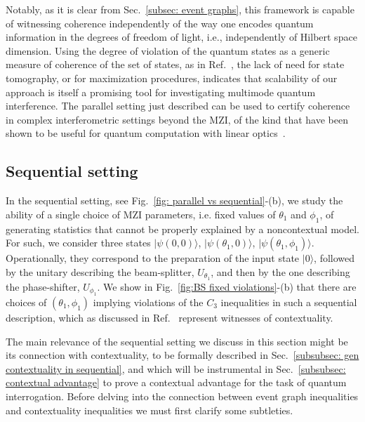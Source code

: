\documentclass[letterpaper,onecolumn,12pt,accepted=2024-01-17]{article}
\begin{document}
Notably, as it is clear from Sec.~\ref{subsec: event graphs}, this framework is capable of witnessing coherence independently of the way one encodes quantum information in the degrees of freedom of light, i.e., independently of Hilbert space dimension. Using the degree of violation of the quantum states as a generic measure of coherence of the set of states, as in Ref.~\cite{giordani2020experimental}, the lack of need for state tomography, or for maximization procedures, indicates that scalability of our approach is itself a promising tool for investigating multimode quantum interference. { The parallel setting just described can be used to certify coherence in complex interferometric settings beyond the MZI, of the kind that have been shown to be useful for quantum computation with linear optics~\cite{taballione2021universal}.}

\subsection{Sequential setting}\label{subsec: sequential setting}

In the sequential setting, see Fig.~\ref{fig: parallel vs sequential}-(b), we study the ability of a single choice of MZI parameters, i.e. fixed values of $\theta_1$ and $\phi_1$, of generating statistics that cannot be properly explained by a noncontextual model. For such, we consider three states $\vert \psi(0,0) \rangle$, $\vert \psi(\theta_1,0)\rangle$, $\vert \psi(\theta_1,\phi_1)\rangle$. Operationally, they correspond to the preparation of the input state $\vert 0 \rangle$, followed by the unitary describing the beam-splitter, $U_{\theta_1}$, and then by the one describing the phase-shifter, $U_{\phi_1}$. We show in Fig.~\ref{fig:BS fixed violations}-(b) that there are choices of $(\theta_1,\phi_1)$ implying violations of the $C_3$ inequalities { in such a sequential description}, which as discussed in Ref.~\cite{wagner2022inequalities} represent witnesses of contextuality.

{The main relevance of the sequential setting we discuss in this section might be its connection with contextuality, to be formally described in Sec.~\ref{subsubsec: gen contextuality in sequential}, and which will be instrumental in Sec.~\ref{subsubsec: contextual advantage} to prove a contextual advantage for the task of quantum interrogation. Before delving into the connection between event graph inequalities and contextuality inequalities we must first clarify some subtleties.}
\end{document}

